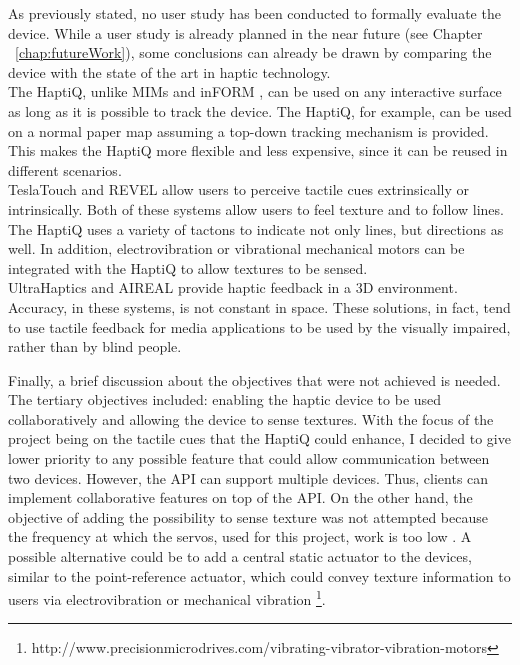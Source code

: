 As previously stated, no user study has been conducted to formally evaluate the device. While a user study is already planned in the near future (see Chapter ~\ref{chap:futureWork}), some conclusions can already be drawn by comparing the device with the state of the art in haptic technology. \\
The HaptiQ, unlike MIMs \cite{brock2010usage} and inFORM \cite{follmer2013inform}, can be used on any interactive surface as long as it is possible to track the device. The HaptiQ, for example, can be used on a normal paper map assuming a top-down tracking mechanism is provided. This makes the HaptiQ more flexible and less expensive, since it can be reused in different scenarios.\\
TeslaTouch \cite{bau2010teslatouch} and REVEL \cite{bau2012revel} allow users to perceive tactile cues extrinsically or intrinsically. Both of these systems allow users to feel texture and to follow lines. The HaptiQ uses a variety of tactons to indicate not only lines, but directions as well. In addition, electrovibration or vibrational mechanical motors can be integrated with the HaptiQ to allow textures to be sensed. \\
UltraHaptics \cite{carter2013ultrahaptics} and AIREAL \cite{sodhi2013aireal} provide haptic feedback in a 3D environment. Accuracy, in these systems, is not constant in space. These solutions, in fact, tend to use tactile feedback for media applications to be used by the visually impaired, rather than by blind people. 

Finally, a brief discussion about the objectives that were not achieved is needed. The tertiary objectives included: enabling the haptic device to be used collaboratively and allowing the device to sense textures. 
With the focus of the project being on the tactile cues that the HaptiQ could enhance, I decided to give lower priority to any possible feature that could allow communication between two devices. However, the API can support multiple devices. Thus, clients can implement  collaborative features on top of the API.
On the other hand, the objective of adding the possibility to sense texture was not attempted because the frequency at which the servos, used for this project, work is too low \cite{brown2005first}. A possible alternative could be to add a central static actuator to the devices, similar to the point-reference actuator, which could convey texture information to users via electrovibration \cite{bau2010teslatouch, bau2012revel} or mechanical vibration \footnote{http://www.precisionmicrodrives.com/vibrating-vibrator-vibration-motors}.   